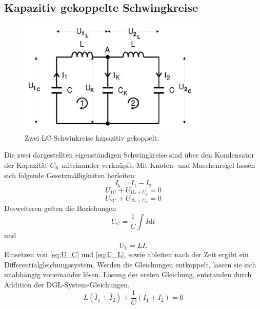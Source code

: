 \subsection{Kapazitiv gekoppelte Schwingkreise}
\label{sec:Theorie1}
\begin{figure}[h]
	\centering
	\label{fig:gekoppelte SK}
		\includegraphics[width=0.8\textwidth]{Bilder/2SK.pdf}
		\caption{Zwei LC-Schwinkreise kapazitiv gekoppelt.}
\label{fig:gekoppelte SK}
\end{figure}
Die zwei dargestellten eigenständigen Schwingkreise sind über den Kondensator der Kapazität $C_\mathup{K}$ miteinander verknüpft.
 Mit Knoten- und Maschenregel lassen sich folgende Gesetzmäßigkeiten herleiten:
\begin{equation}
	I_\mathup{k}=I_1-I_2
	\label{eq:I_k}
\end{equation}
\begin{equation}
	U_{1\mathup{C}}+U_{1\mathup{L}+U_{\mathup{k}}}=0
	\label{eq:U_1}
\end{equation}
\begin{equation}
	U_{2\mathup{C}}+U_{2\mathup{L}+U_{\mathup{k}}}=0
	\label{eq:U_2}
\end{equation}
Desweiteren gelten die Beziehungen
\begin{equation}
	U_\mathup{C}=\frac{1}{C}\int{I\mathup{d}t}
	\label{eq:U_C}
\end{equation}
und
\begin{equation}
	U_\mathup{L}=L\dot{I}.
	\label{eq:U_L}
\end{equation}
Einsetzen von \eqref{eq:U_C} und \eqref{eq:U_L}, sowie ableiten nach der Zeit ergibt ein Differentialgleichungssystem. 
Werden die Gleichungen entkoppelt, lassen sie sich unabhängig voneinander lösen.
Lösung der ersten Gleichung, entstanden durch Addition der DGL-System-Gleichungen,
\begin{equation}
	L(\ddot{I_1}+\ddot{I_2})+\frac{1}{C}({I_1}+{I_2})=0
	\label{eq:I_1+I_2}
\end{equation}
